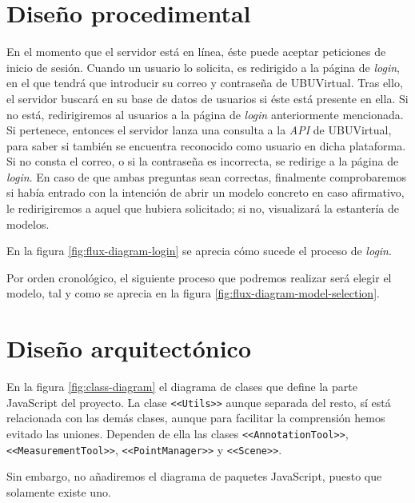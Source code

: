 \section{Diseño procedimental}
En el momento que el servidor está en línea, éste puede aceptar peticiones de inicio de sesión. Cuando un usuario lo solicita, es redirigido a la página de \textit{login}, en el que tendrá que introducir su correo y contraseña de UBUVirtual. Tras ello, el servidor buscará en su base de datos de usuarios si éste está presente en ella. Si no está, redirigiremos al usuarios a la página de \textit{login} anteriormente mencionada. Si pertenece, entonces el servidor lanza una consulta a la \textit{API} de UBUVirtual, para saber si también se encuentra reconocido como usuario en dicha plataforma. Si no consta el correo, o si la contraseña es incorrecta, se redirige a la página de \textit{login}. En caso de que ambas preguntas sean correctas, finalmente comprobaremos si había entrado con la intención de abrir un modelo concreto en caso afirmativo, le redirigiremos a aquel que hubiera solicitado; si no, visualizará la estantería de modelos.

En la figura \ref{fig:flux-diagram-login} se aprecia cómo sucede el proceso de \textit{login}.

Por orden cronológico, el siguiente proceso que podremos realizar será elegir el modelo, tal y como se aprecia en la figura \ref{fig:flux-diagram-model-selection}.

\section{Diseño arquitectónico}
En la figura \ref{fig:class-diagram} el diagrama de clases que define la parte JavaScript del proyecto. La clase \texttt{<<Utils>>} aunque separada del resto, sí está relacionada con las demás clases, aunque para facilitar la comprensión hemos evitado las uniones. Dependen de ella las clases \texttt{<<AnnotationTool>>}, \texttt{<<MeasurementTool>>}, \texttt{<<PointManager>>} y \texttt{<<Scene>>}.

Sin embargo, no añadiremos el diagrama de paquetes JavaScript, puesto que solamente existe uno.


